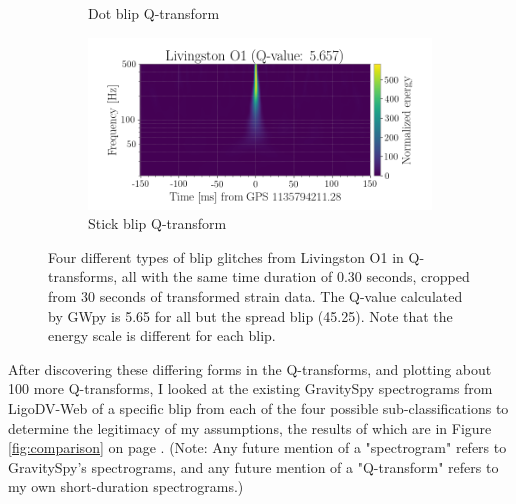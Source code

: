 \documentclass[a4paper]{article}
\begin{document}
\begin{figure}[h!]
\begin{subfigure}{.49\textwidth}
		\caption{Dot blip Q-transform}
		\label{fig:dot}
	\end{subfigure}
	\begin{subfigure}{.49\textwidth}
		\centering
		\includegraphics[width=1\linewidth]{stick_blip}
		\caption{Stick blip Q-transform}
		\label{fig:stick}
	\end{subfigure}
	\caption{Four different types of blip glitches from Livingston O1 in Q-transforms, all with the same time duration of 0.30 seconds, cropped from 30 seconds of transformed strain data. The Q-value calculated by GWpy is 5.65 for all but the spread blip (45.25). Note that the energy scale is different for each blip.}
	\label{fig:q_transforms}
\end{figure}

After discovering these differing forms in the Q-transforms, and plotting about 100 more Q-transforms, I looked at the existing GravitySpy spectrograms from LigoDV-Web of a specific blip from each of the four possible sub-classifications to determine the legitimacy of my assumptions, the results of which are in Figure \ref{fig:comparison} on page \pageref{fig:comparison}. (Note: Any future mention of a "spectrogram" refers to GravitySpy's spectrograms, and any future mention of a "Q-transform" refers to my own short-duration spectrograms.)
\end{document}
